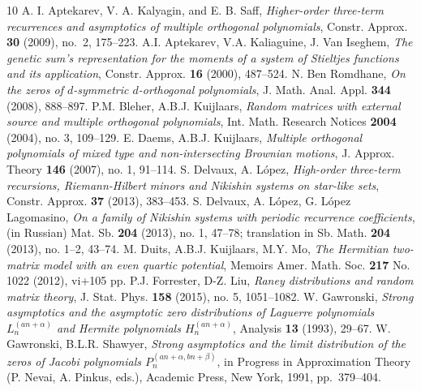 \documentclass[12pt]{article}
\numberwithin{equation}{section}
\begin{document}
\begin{thebibliography}{10}
 A. I. Aptekarev, V. A. Kalyagin, and E. B. Saff, 
\textit{Higher-order three-term recurrences and asymptotics of multiple orthogonal polynomials}, 
Constr. Approx. \textbf{30} (2009), no.~2, 175--223.
 A.I. Aptekarev, V.A. Kaliaguine,  J. Van Iseghem, 
\textit{The genetic sum's representation for the moments of a system of Stieltjes functions and its application}, Constr. Approx. \textbf{16} (2000), 487--524.
 N. Ben Romdhane, 
\textit{On the zeros of $d$-symmetric $d$-orthogonal polynomials}, 
J. Math. Anal. Appl. \textbf{344} (2008), 888--897.
 P.M. Bleher, A.B.J. Kuijlaars, 
\textit{Random matrices with external source and multiple orthogonal polynomials},
Int. Math. Research Notices \textbf{2004} (2004), no. 3, 109--129.
 E. Daems, A.B.J. Kuijlaars, 
\textit{Multiple orthogonal polynomials of mixed type and non-intersecting Brownian motions},
J. Approx. Theory \textbf{146} (2007), no. 1, 91--114. 
 S. Delvaux, A. L\'opez, 
\textit{High-order three-term recursions, Riemann-Hilbert minors and Nikishin systems on star-like sets}, 
Constr. Approx. \textbf{37} (2013), 383--453.
 S. Delvaux, A. L\'opez, G. L\'opez Lagomasino,
\textit{On a family of Nikishin systems with periodic recurrence coefficients}, 
(in Russian) Mat. Sb.  \textbf{204}  (2013),  no. 1, 47--78;  translation in 
Sb. Math.  \textbf{204}  (2013),  no. 1--2, 43--74.
 M. Duits, A.B.J. Kuijlaars, M.Y. Mo,
\textit{The Hermitian two-matrix model with an even quartic potential}, 
Memoirs Amer. Math. Soc. \textbf{217} No. 1022 (2012), vi+105 pp.
 P.J. Forrester, D-Z. Liu,
\textit{Raney distributions and random matrix theory},
J. Stat. Phys. \textbf{158} (2015), no. 5, 1051--1082.
 W. Gawronski,
\textit{Strong asymptotics and the asymptotic zero distributions of Laguerre polynomials $L_n^{(an+\alpha)}$ and Hermite polynomials $H_n^{(an+\alpha)}$},
Analysis \textbf{13} (1993), 29--67.
 W. Gawronski, B.L.R. Shawyer,
\textit{Strong asymptotics and the limit distribution of the zeros of Jacobi polynomials $P_n^{(an+\alpha,bn+\beta)}$},
in Progress in Approximation Theory (P. Nevai, A. Pinkus, eds.), Academic Press, New York, 1991, pp.~379--404.

\end{thebibliography}
\end{document}
